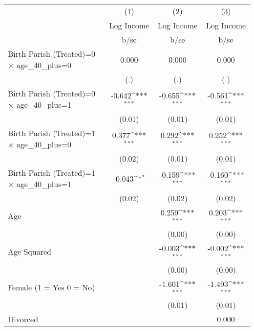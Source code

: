 {
\def\sym#1{\ifmmode^{#1}\else\(^{#1}\)\fi}
\begin{tabular}{l*{3}{c}}
\hline\hline
                    &\multicolumn{1}{c}{(1)}&\multicolumn{1}{c}{(2)}&\multicolumn{1}{c}{(3)}\\
                    &\multicolumn{1}{c}{Log Income}&\multicolumn{1}{c}{Log Income}&\multicolumn{1}{c}{Log Income}\\
                    &        b/se         &        b/se         &        b/se         \\
\hline
Birth Parish (Treated)=0 $\times$ age\_40\_plus=0&       0.000         &       0.000         &       0.000         \\
                    &         (.)         &         (.)         &         (.)         \\
Birth Parish (Treated)=0 $\times$ age\_40\_plus=1&      -0.642\sym{***}&      -0.655\sym{***}&      -0.561\sym{***}\\
                    &      (0.01)         &      (0.01)         &      (0.01)         \\
Birth Parish (Treated)=1 $\times$ age\_40\_plus=0&       0.377\sym{***}&       0.292\sym{***}&       0.252\sym{***}\\
                    &      (0.02)         &      (0.01)         &      (0.01)         \\
Birth Parish (Treated)=1 $\times$ age\_40\_plus=1&      -0.043\sym{*}  &      -0.159\sym{***}&      -0.160\sym{***}\\
                    &      (0.02)         &      (0.02)         &      (0.02)         \\
Age                 &                     &       0.259\sym{***}&       0.203\sym{***}\\
                    &                     &      (0.00)         &      (0.00)         \\
Age Squared         &                     &      -0.003\sym{***}&      -0.002\sym{***}\\
                    &                     &      (0.00)         &      (0.00)         \\
Female (1 = Yes 0 = No)&                     &      -1.601\sym{***}&      -1.493\sym{***}\\
                    &                     &      (0.01)         &      (0.01)         \\
Divorced            &                     &                     &       0.000         \\

\end{tabular}}

